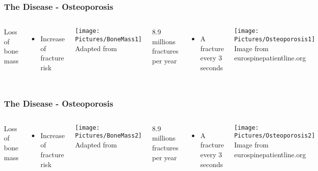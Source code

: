 \documentclass[xcolor=table,11pt]{beamer}
\begin{document}
	\begin{frame}[noframenumbering]
		\frametitle{The Disease - Osteoporosis}

		\begin{columns}
			Loss of bone mass
			\begin{itemize}
				\item Increase of fracture risk
			\end{itemize}

			\vspace{5mm}

			\texttt{[image: Pictures/BoneMass1]}\\
			\tiny{Adapted from \cite{p1}}

			8.9 millions fractures per year
			\begin{itemize}
				\item A fracture every 3 seconds
			\end{itemize}

			\vspace{5mm}

			\texttt{[image: Pictures/Osteoporosis1]}\\
			\tiny{Image from eurospinepatientline.org}
		\end{columns}

	\end{frame}

	\begin{frame}[noframenumbering]
		\frametitle{The Disease - Osteoporosis}

		\begin{columns}
			\column{0.45\linewidth}
			Loss of bone mass
			\begin{itemize}
				\item Increase of fracture risk
			\end{itemize}

			\vspace{5mm}

			\texttt{[image: Pictures/BoneMass2]}\\
			\tiny{Adapted from \cite{p1}}

			\column{0.45\linewidth}
			8.9 millions fractures per year
			\begin{itemize}
				\item A fracture every 3 seconds
			\end{itemize}

			\vspace{5mm}

			\texttt{[image: Pictures/Osteoporosis2]}\\
			\tiny{Image from eurospinepatientline.org}

		\end{columns}

	\end{frame}
\end{document}
